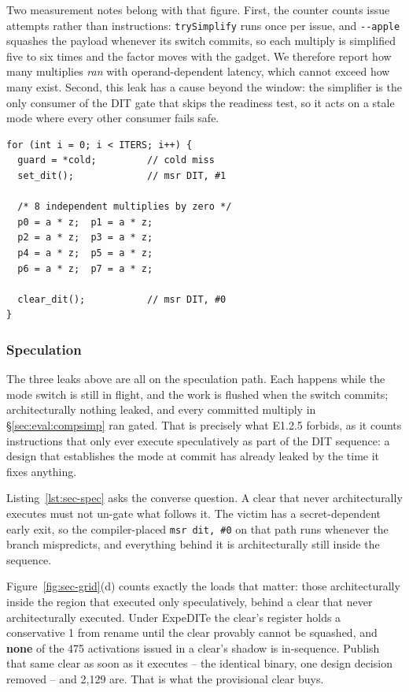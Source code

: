 Two measurement notes belong with that figure. First, the counter counts issue
attempts rather than instructions: \texttt{trySimplify} runs once per issue, and
\texttt{-{}-apple} squashes the payload whenever its switch commits, so each
multiply is simplified five to six times and the factor moves with the gadget.
We therefore report how many multiplies \emph{ran} with operand-dependent
latency, which cannot exceed how many exist. Second, this leak has a cause
beyond the window: the simplifier is the only consumer of the DIT gate that
skips the readiness test, so it acts on a stale mode where every other consumer
fails safe.

\begin{lstlisting}[float=t, caption={The computation-simplification
microbenchmark. Eight independent multiplies by a register holding zero, issued
in the switch's shadow; \texttt{z} is opaque to the compiler.},
label=lst:sec-compsimp]
for (int i = 0; i < ITERS; i++) {
  guard = *cold;         // cold miss
  set_dit();             // msr DIT, #1

  /* 8 independent multiplies by zero */
  p0 = a * z;  p1 = a * z;
  p2 = a * z;  p3 = a * z;
  p4 = a * z;  p5 = a * z;
  p6 = a * z;  p7 = a * z;

  clear_dit();           // msr DIT, #0
}
\end{lstlisting}

\subsubsection{Speculation}\label{sec:eval:spec}

The three leaks above are all on the speculation path. Each happens while the
mode switch is still in flight, and the work is flushed when the switch commits;
architecturally nothing leaked, and every committed multiply in
\S\ref{sec:eval:compsimp} ran gated. That is precisely what E1.2.5 forbids, as
it counts instructions that only ever execute speculatively as part of the DIT
sequence: a design that establishes the mode at commit has already leaked by the
time it fixes anything.

Listing~\ref{lst:sec-spec} asks the converse question. A clear that never
architecturally executes must not un-gate what follows it. The victim has a
secret-dependent early exit, so the compiler-placed \texttt{msr dit, \#0} on
that path runs whenever the branch mispredicts, and everything behind it is
architecturally still inside the sequence.

Figure~\ref{fig:sec-grid}(d) counts exactly the loads that matter: those
architecturally inside the region that executed only speculatively, behind a
clear that never architecturally executed. Under ExpeDITe the clear's register
holds a conservative 1 from rename until the clear provably cannot be squashed,
and \textbf{none} of the 475 activations issued in a clear's shadow is
in-sequence. Publish that same clear as soon as it executes -- the identical
binary, one design decision removed -- and 2{,}129 are. That is what the
provisional clear buys.

